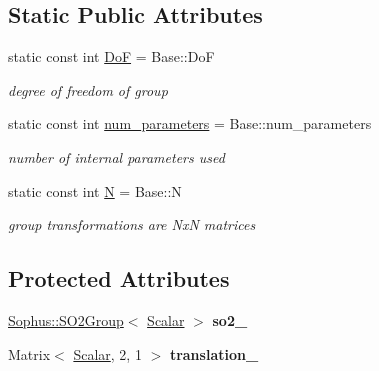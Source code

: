 \subsection*{Static Public Attributes}
\begin{DoxyCompactItemize}
\item 
static const int \hyperlink{class_sophus_1_1_s_e2_group_a4c578d8a3dd37d860b45db0497759098}{DoF} = Base\+::\+DoF\hypertarget{class_sophus_1_1_s_e2_group_a4c578d8a3dd37d860b45db0497759098}{}\label{class_sophus_1_1_s_e2_group_a4c578d8a3dd37d860b45db0497759098}

\begin{DoxyCompactList}\small\item\em degree of freedom of group \end{DoxyCompactList}\item 
static const int \hyperlink{class_sophus_1_1_s_e2_group_a98c89f88343958bb3c65c1b3240cf295}{num\+\_\+parameters} = Base\+::num\+\_\+parameters\hypertarget{class_sophus_1_1_s_e2_group_a98c89f88343958bb3c65c1b3240cf295}{}\label{class_sophus_1_1_s_e2_group_a98c89f88343958bb3c65c1b3240cf295}

\begin{DoxyCompactList}\small\item\em number of internal parameters used \end{DoxyCompactList}\item 
static const int \hyperlink{class_sophus_1_1_s_e2_group_abbe9d16d13ed2351b7e0589f89e9d502}{N} = Base\+::N\hypertarget{class_sophus_1_1_s_e2_group_abbe9d16d13ed2351b7e0589f89e9d502}{}\label{class_sophus_1_1_s_e2_group_abbe9d16d13ed2351b7e0589f89e9d502}

\begin{DoxyCompactList}\small\item\em group transformations are NxN matrices \end{DoxyCompactList}\end{DoxyCompactItemize}
\subsection*{Protected Attributes}
\begin{DoxyCompactItemize}
\item 
\hyperlink{class_sophus_1_1_s_o2_group}{Sophus\+::\+S\+O2\+Group}$<$ \hyperlink{class_sophus_1_1_s_e2_group_a2c3f69904c79825984774d78a107ab35}{Scalar} $>$ {\bfseries so2\+\_\+}\hypertarget{class_sophus_1_1_s_e2_group_a5e02fb49e86a4a4adb230850ecb9a96a}{}\label{class_sophus_1_1_s_e2_group_a5e02fb49e86a4a4adb230850ecb9a96a}

\item 
Matrix$<$ \hyperlink{class_sophus_1_1_s_e2_group_a2c3f69904c79825984774d78a107ab35}{Scalar}, 2, 1 $>$ {\bfseries translation\+\_\+}\hypertarget{class_sophus_1_1_s_e2_group_ab99e569e0d4765534f595f4243cf0e33}{}\label{class_sophus_1_1_s_e2_group_ab99e569e0d4765534f595f4243cf0e33}

\end{DoxyCompactItemize}
